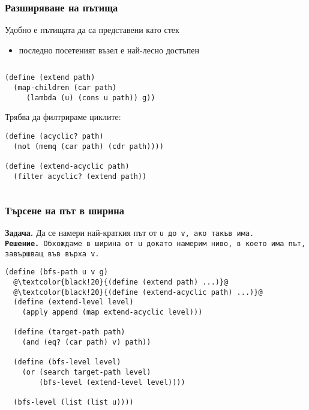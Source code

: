 \documentclass{beamer}
\begin{document}
\begin{frame}[fragile]
  \frametitle{Разширяване на пътища}
  Удобно е пътищата да са представени като \alert{стек}
  \begin{itemize}
  \item последно посетеният възел е най-лесно достъпен
  \end{itemize}
  \pause
  \begin{columns}[T]
    \begin{column}{0.65\textwidth}
      \pause
\begin{lstlisting}
(define (extend path)
  (map-children (car path)
     (lambda (u) (cons u path)) g))
\end{lstlisting}
      \pause
      Трябва да филтрираме циклите:
      \pause
\begin{lstlisting}
(define (acyclic? path)
  (not (memq (car path) (cdr path))))

(define (extend-acyclic path)
  (filter acyclic? (extend path))
\end{lstlisting}
    \end{column}
    \begin{column}{0.35\textwidth}
      \samplegraph
    \end{column}
  \end{columns}
\end{frame}

\begin{frame}[fragile]
  \frametitle{Търсене на път в ширина}
  \textbf{Задача.} Да се намери \alert{най-краткия} път от \tt u до \tt v, ако такъв има.\\
  \pause
  \textbf{Решение.} Обхождаме в ширина от \tt u докато намерим ниво, в което има път, завършващ във върха  \tt v.
  \pause
  \small
\begin{lstlisting}
(define (bfs-path u v g)
  @\textcolor{black!20}{(define (extend path) ...)}@
  @\textcolor{black!20}{(define (extend-acyclic path) ...)}@
  (define (extend-level level)
    (apply append (map extend-acyclic level)))

  (define (target-path path)
    (and (eq? (car path) v) path))

  (define (bfs-level level)
    (or (search target-path level)
        (bfs-level (extend-level level))))

  (bfs-level (list (list u))))
\end{lstlisting}
\end{frame}
\end{document}
